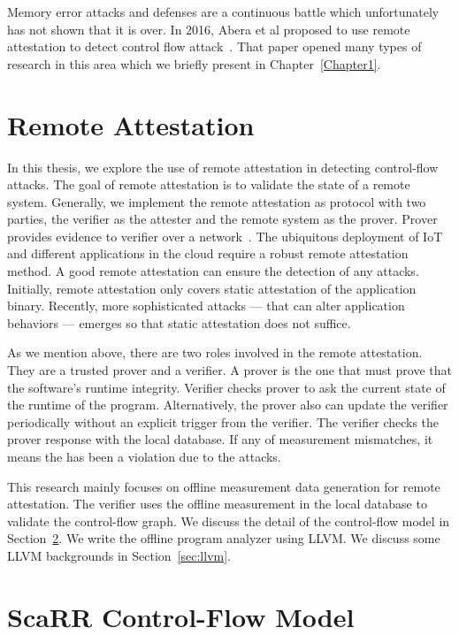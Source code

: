 Memory error attacks and defenses are a continuous battle which unfortunately
has not shown that it is over. In 2016, Abera et al proposed to use remote
attestation to detect control flow
attack~\cite{aberaCFLATControlFlowAttestation2016}. That paper opened many types
of research in this area which we briefly present in Chapter~\ref{Chapter1}.
 
\section{Remote Attestation}
\label{sec:remote-attestation}

In this thesis, we explore the use of remote attestation in detecting
control-flow attacks. The goal of remote attestation is to validate the state of
a remote system. Generally, we implement the remote attestation as protocol with
two parties, the verifier as the attester and the remote system as the prover.
Prover provides evidence to verifier over a
network~\cite{cokerPrinciplesRemoteAttestation2011a}. The ubiquitous deployment
of IoT and different applications in the cloud require a robust remote
attestation method. A good remote attestation can ensure the detection of any
attacks. Initially, remote attestation only covers static attestation of the
application binary. Recently, more sophisticated attacks --- that can alter
application behaviors --- emerges so that static attestation does not suffice. 

As we mention above, there are two roles involved in the remote attestation.
They are a trusted prover and a verifier. A prover is the one that must prove
that the software's runtime integrity. Verifier checks prover to ask the current
state of the runtime of the program. Alternatively, the prover also can update
the verifier periodically without an explicit trigger from the verifier. The
verifier checks the prover response with the local database. If any of
measurement mismatches, it means the has been a violation due to the attacks.

This research mainly focuses on offline measurement data generation for remote
attestation. The verifier uses the offline measurement in the local database to
validate the control-flow graph.  We discuss the detail of the control-flow
model in Section~\ref{sec:scarr-model}. We write the offline program analyzer
using LLVM. We discuss some LLVM backgrounds in Section~\ref{sec:llvm}.

\section{ScaRR Control-Flow Model} 
\label{sec:scarr-model}

